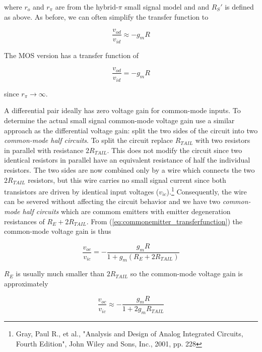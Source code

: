 \noindent where $r_{o}$ and $r_{\pi}$ are from the hybrid-$\pi$ small signal model and and $R_{S}'$ is defined as above. As before, we can often simplify the transfer function to

\begin{equation}
\frac{v_{od}}{v_{id}} \approx -g_{m}R
\label{eq:resistivediffpair_diff_gain_approx}
\end{equation}

\noindent The MOS version has a transfer function of

\begin{equation}
\frac{v_{od}}{v_{id}} = -g_{m}R
\end{equation}

\noindent since $r_{\pi} \rightarrow \infty$.
\par
A differential pair ideally has zero voltage gain for common-mode inputs. To determine the actual small signal common-mode voltage gain use a similar approach as the differential voltage gain: split the two sides of the circuit into two \textit{common-mode half circuits}. To split the circuit replace $R_{TAIL}$ with two resistors in parallel with resistance $2R_{TAIL}$. This does not modify the circuit since two identical resistors in parallel have an equivalent resistance of half the individual resistors. The two sides are now combined only by a wire which connects the two $2R_{TAIL}$ resistors, but this wire carries no small signal current since both transistors are driven by identical input voltages ($v_{ic}$).\footnote{Gray, Paul R., et al., "Analysis and Design of Analog Integrated Circuits, Fourth Edition", John Wiley and Sons, Inc., 2001, pp. 228} Consequently, the wire can be severed without affecting the circuit behavior and we have two \textit{common-mode half circuits} which are commom emitters with emitter degeneration resistances of $R_{E}+2R_{TAIL}$. From (\ref{eq:commonemitter_transferfunction}) the common-mode voltage gain is thus

\begin{equation}
\frac{v_{oc}}{v_{ic}} = -\frac{g_{m}R}{1+g_{m}(R_{E}+2R_{TAIL})}
\label{eq:resistivediffpair_cm_gain}
\end{equation}

\noindent $R_{E}$ is usually much smaller than $2R_{TAIL}$ so the common-mode voltage gain is approximately

\begin{equation}
\frac{v_{oc}}{v_{ic}} \approx -\frac{g_{m}R}{1+2g_{m}R_{TAIL}}
\label{eq:resistivediffpair_cm_gain_approx}
\end{equation}

